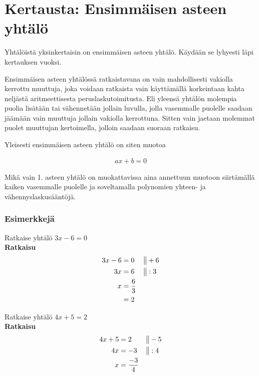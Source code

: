 \chapter{Kertausta: Ensimmäisen asteen yhtälö}

Yhtälöistä yksinkertaisin on ensimmäisen asteen yhtälö. Käydään se lyhyesti
läpi kertauksen vuoksi.

Ensimmäisen asteen yhtälössä ratkaistavana on vain mahdollisesti vakiolla
kerrottu muuttuja, joka voidaan ratkaista vain käyttämällä korkeintaan
kahta neljästä aritmeettisesta peruslaskutoimitusta. Eli yleensä
yhtälön molempia puolia lisätään tai vähennetään jollain luvulla, jolla
vasemmalle puolelle saadaan jäämään vain muuttuja jollain vakiolla kerrottuna.
Sitten vain jaetaan molemmat puolet muuttujan kertoimella, jolloin saadaan
suoraan ratkaisu.

Yleisesti ensimmäisen asteen yhtälö on siten muotoa

\begin{align*}
    ax + b = 0
\end{align*}

Mikä vain 1. asteen yhtälö on muokattavissa aina annettuun
muotoon siirtämällä kaiken vasemmalle puolelle ja
soveltamalla polynomien yhteen- ja vähennyslaskusääntöjä.

\subsection*{Esimerkkejä}

\begin{esimerkki}
Ratkaise yhtälö $3x - 6 = 0$ \\
\textbf{Ratkaisu} \\
  \begin{align*}
    3x - 6 &= 0 & \big\| & +6 \\
        3x &= 6 & \big\| & :3 \\
         x &= \frac{6}{3} \\
           &= 2
  \end{align*}
\end{esimerkki}

\begin{esimerkki}
Ratkaise yhtälö $4x + 5 = 2$ \\
\textbf{Ratkaisu}
\begin{align*}
    4x + 5 &= 2  & \big\| & -5 \\
        4x &= -3 & \big\| & :4 \\
         x &= \frac{-3}{4}
 \end{align*}
\end{esimerkki}

